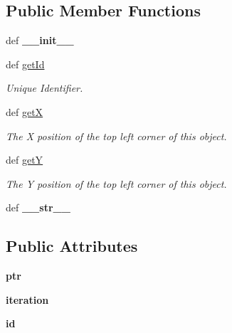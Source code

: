 \subsection*{Public Member Functions}
\begin{DoxyCompactItemize}
\item 
\hypertarget{classGameObject_1_1Mappable_a3b50a330f5d310394f13a2514e0f5ee5}{
def {\bfseries \_\-\_\-init\_\-\_\-}}
\label{classGameObject_1_1Mappable_a3b50a330f5d310394f13a2514e0f5ee5}

\item 
\hypertarget{classGameObject_1_1Mappable_ac2b76487a93e9e56615dc47b4dcb0928}{
def \hyperlink{classGameObject_1_1Mappable_ac2b76487a93e9e56615dc47b4dcb0928}{getId}}
\label{classGameObject_1_1Mappable_ac2b76487a93e9e56615dc47b4dcb0928}

\begin{DoxyCompactList}\small\item\em Unique Identifier. \item\end{DoxyCompactList}\item 
def \hyperlink{classGameObject_1_1Mappable_a3ae7d302c87c0a6f1e211a7584c3b807}{getX}
\begin{DoxyCompactList}\small\item\em The X position of the top left corner of this object. \item\end{DoxyCompactList}\item 
def \hyperlink{classGameObject_1_1Mappable_af7b558a1be2dc80d1aa78f306e226c10}{getY}
\begin{DoxyCompactList}\small\item\em The Y position of the top left corner of this object. \item\end{DoxyCompactList}\item 
\hypertarget{classGameObject_1_1Mappable_ac999580cd8c2dad4d0f6200875bdb0f7}{
def {\bfseries \_\-\_\-str\_\-\_\-}}
\label{classGameObject_1_1Mappable_ac999580cd8c2dad4d0f6200875bdb0f7}

\end{DoxyCompactItemize}
\subsection*{Public Attributes}
\begin{DoxyCompactItemize}
\item 
\hypertarget{classGameObject_1_1Mappable_a062d225b787ddf7fc28a3ca50d1e1d2d}{
{\bfseries ptr}}
\label{classGameObject_1_1Mappable_a062d225b787ddf7fc28a3ca50d1e1d2d}

\item 
\hypertarget{classGameObject_1_1Mappable_a21e112d15966584c1e4f165de52a4ef5}{
{\bfseries iteration}}
\label{classGameObject_1_1Mappable_a21e112d15966584c1e4f165de52a4ef5}

\item 
\hypertarget{classGameObject_1_1Mappable_a952b8d62ae9d11a73fa1b2ec2c0244b6}{
{\bfseries id}}
\label{classGameObject_1_1Mappable_a952b8d62ae9d11a73fa1b2ec2c0244b6}

\end{DoxyCompactItemize}


